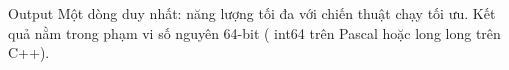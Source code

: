 Output  
Một dòng duy nhất: năng lượng tối đa với chiến thuật chạy tối ưu. Kết quả nằm trong phạm vi số nguyên 64-bit (   int64   trên Pascal hoặc   long long   trên C++).